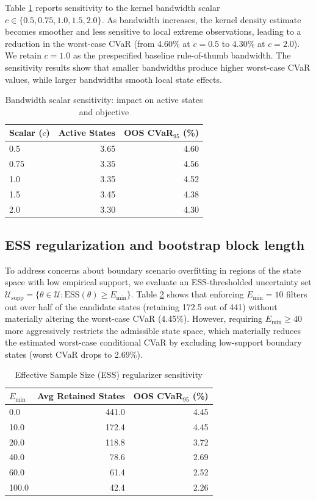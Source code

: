 \documentclass[smallextended]{svjour3}
\begin{document}
Table \ref{tab:sens_bw} reports sensitivity to the kernel bandwidth scalar $c \in \{0.5, 0.75, 1.0, 1.5, 2.0\}$. As bandwidth increases, the kernel density estimate becomes smoother and less sensitive to local extreme observations, leading to a reduction in the worst-case CVaR (from 4.60\% at $c=0.5$ to 4.30\% at $c=2.0$). We retain $c=1.0$ as the prespecified baseline rule-of-thumb bandwidth. The sensitivity results show that smaller bandwidths produce higher worst-case CVaR values, while larger bandwidths smooth local state effects.

\begin{table}[htbp]
\centering
\caption{Bandwidth scalar sensitivity: impact on active states and objective}
\label{tab:sens_bw}
\begin{tabular}{lrr}
\toprule
\textbf{Scalar ($c$)} & \textbf{Active States} & \textbf{OOS CVaR$_{95}$ (\%)} \\
\midrule
0.5 & 3.65 & 4.60 \\
0.75 & 3.35 & 4.56 \\
1.0 & 3.35 & 4.52 \\
1.5 & 3.45 & 4.38 \\
2.0 & 3.30 & 4.30 \\
\bottomrule
\end{tabular}
\end{table}

\subsection{ESS regularization and bootstrap block length}
To address concerns about boundary scenario overfitting in regions of the state space with low empirical support, we evaluate an ESS-thresholded uncertainty set $\mathcal{U}_{\text{supp}} = \{\theta \in \mathcal{U} : \text{ESS}(\theta) \ge E_{\min}\}$. Table \ref{tab:sens_ess} shows that enforcing $E_{\min} = 10$ filters out over half of the candidate states (retaining 172.5 out of 441) without materially altering the worst-case CVaR (4.45\%). However, requiring $E_{\min} \ge 40$ more aggressively restricts the admissible state space, which materially reduces the estimated worst-case conditional CVaR by excluding low-support boundary states (worst CVaR drops to 2.69\%).

\begin{table}[htbp]
\centering
\caption{Effective Sample Size (ESS) regularizer sensitivity}
\label{tab:sens_ess}
\begin{tabular}{lrr}
\toprule
$E_{\min}$ & \textbf{Avg Retained States} & \textbf{OOS CVaR$_{95}$ (\%)} \\
\midrule
0.0 & 441.0 & 4.45 \\
10.0 & 172.4 & 4.45 \\
20.0 & 118.8 & 3.72 \\
40.0 & 78.6 & 2.69 \\
60.0 & 61.4 & 2.52 \\
100.0 & 42.4 & 2.26 \\
\bottomrule
\end{tabular}
\end{table}
\end{document}
